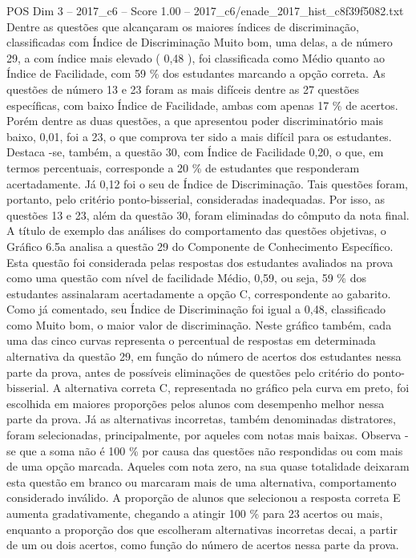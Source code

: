 \begin{textsample}{POS Dim 3 – 2017\_c6 – Score 1.00 – 2017\_c6/enade\_2017\_hist\_c8f39f5082.txt}
Dentre as questões que alcançaram os maiores índices de discriminação, classificadas com Índice de Discriminação Muito bom, uma delas, a de número 29, a com índice mais elevado ( 0,48 ), foi classificada como Médio quanto ao Índice de Facilidade, com 59 \% dos estudantes marcando a opção correta.
As questões de número 13 e 23 foram as mais difíceis dentre as 27 questões específicas, com baixo Índice de Facilidade, ambas com apenas 17 \% de acertos.
Porém dentre as duas questões, a que apresentou poder discriminatório mais baixo, 0,01, foi a 23, o que comprova ter sido a mais difícil para os estudantes.
Destaca -se, também, a questão 30, com Índice de Facilidade 0,20, o que, em termos percentuais, corresponde a 20 \% de estudantes que responderam acertadamente.
Já 0,12 foi o seu de Índice de Discriminação.
Tais questões foram, portanto, pelo critério ponto-bisserial, consideradas inadequadas.
Por isso, as questões 13 e 23, além da questão 30, foram eliminadas do cômputo da nota final.
A título de exemplo das análises do comportamento das questões objetivas, o Gráfico 6.5a analisa a questão 29 do Componente de Conhecimento Específico.
Esta questão foi considerada pelas respostas dos estudantes avaliados na prova como uma questão com nível de facilidade Médio, 0,59, ou seja, 59 \% dos estudantes assinalaram acertadamente a opção C, correspondente ao gabarito.
Como já comentado, seu Índice de Discriminação foi igual a 0,48, classificado como Muito bom, o maior valor de discriminação.
Neste gráfico também, cada uma das cinco curvas representa o percentual de respostas em determinada alternativa da questão 29, em função do número de acertos dos estudantes nessa parte da prova, antes de possíveis eliminações de questões pelo critério do ponto-bisserial.
A alternativa correta C, representada no gráfico pela curva em preto, foi escolhida em maiores proporções pelos alunos com desempenho melhor nessa parte da prova.
Já as alternativas incorretas, também denominadas distratores, foram selecionadas, principalmente, por aqueles com notas mais baixas.
Observa -se que a soma não é 100 \% por causa das questões não respondidas ou com mais de uma opção marcada.
Aqueles com nota zero, na sua quase totalidade deixaram esta questão em branco ou marcaram mais de uma alternativa, comportamento considerado inválido.
A proporção de alunos que selecionou a resposta correta E aumenta gradativamente, chegando a atingir 100 \% para 23 acertos ou mais, enquanto a proporção dos que escolheram alternativas incorretas decai, a partir de um ou dois acertos, como função do número de acertos nessa parte da prova.

\end{textsample}
